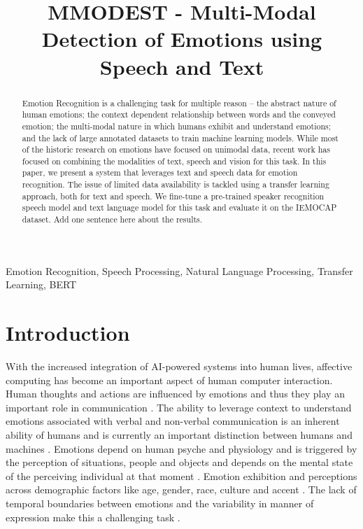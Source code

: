 \documentclass{article}
\title{MMODEST - Multi-Modal Detection of Emotions using Speech and Text}
\begin{document}
%
\maketitle
%
\begin{abstract}
Emotion Recognition is a challenging task for multiple reason – the abstract nature of human emotions; the context dependent relationship between words and the conveyed emotion; the multi-modal nature in which humans exhibit and understand emotions; and the lack of large annotated datasets to train machine learning models. While most of the historic research on emotions have focused on unimodal data, recent work has focused on combining the modalities of text, speech and vision for this task. In this paper, we present a system that leverages text and speech data for emotion recognition. The issue of limited data availability is tackled using a transfer learning approach, both for text and speech. We fine-tune a pre-trained speaker recognition speech model and text language model for this task and evaluate it on the IEMOCAP dataset. Add one sentence here about the results.
\end{abstract}
%
\begin{keywords}
Emotion Recognition, Speech Processing, Natural Language Processing, Transfer Learning, BERT
\end{keywords}
%
\section{Introduction}
\label{sec:intro}

With the increased integration of AI-powered systems into human lives, affective computing has become an important aspect of human computer interaction. Human thoughts and actions are influenced by emotions and thus they play an important role in communication \cite{conv_atten_emo}. The ability to leverage context to understand emotions associated with verbal and non-verbal communication is an inherent ability of humans and is currently an important distinction between humans and machines \cite{compl_fusion}. Emotions depend on human psyche and physiology and is triggered by the perception of situations, people and objects and depends on the mental state of the perceiving individual at that moment \cite{beigi_iemocap}. Emotion exhibition and perceptions across demographic factors like age, gender, race, culture and accent \cite{1904.03833}. The lack of temporal boundaries between emotions and the variability in manner of expression make this a challenging task \cite{1704.08619}.
\end{document}
